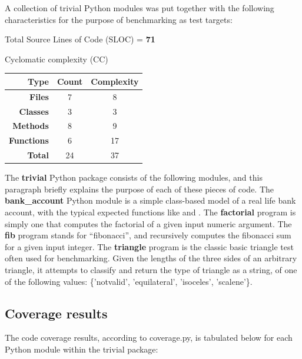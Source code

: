 \documentclass{icldt}
\numberwithin{equation}{section}       %
\begin{document}
{{A collection of \textsf{trivial} Python modules was put together with the following characteristics for the purpose of benchmarking as test targets:

Total Source Lines of Code (SLOC) = \textbf{71}

Cyclomatic complexity (CC)

\begin{tabularx}{\textwidth}{ |r|c|c| }
  \hline
  \textbf{Type} & \textbf{Count} & \textbf{Complexity} \\
  \hline
  \textbf{Files} & 7 & 8  \\
  \hline
  \textbf{Classes} & 3 & 3  \\
  \hline
  \textbf{Methods} & 8 & 9  \\
  \hline
  \textbf{Functions} & 6 & 17  \\
  \hline
  \textbf{Total} & 24 & 37 \\
  \hline
\end{tabularx}

The \textbf{trivial} Python package consists of the following modules, and this paragraph briefly explains the purpose of each of these pieces of code. The \textbf{bank_account} Python module is a simple class-based model of a real life bank account, with the typical expected functions like  and . The \textbf{factorial} program is simply one that computes the factorial of a given input numeric argument. The \textbf{fib} program stands for ``fibonacci'', and recursively computes the fibonacci sum for a given input integer. The \textbf{triangle} program is the classic basic triangle test often used for benchmarking. Given the lengths of the three sides of an arbitrary triangle, it attempts to classify and return the type of triangle as a string, of one of the following values: \{'notvalid', 'equilateral', 'isoceles', 'scalene'\}.

\subsection{Coverage results}

The code coverage results, according to \textsf{coverage.py}, is tabulated below for each Python module within the \textsf{trivial} package:

}}
\end{document}
